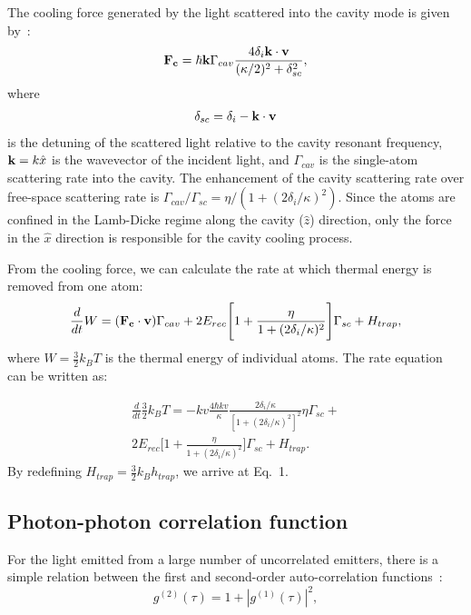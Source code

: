 \documentclass[aps,prl,superscriptaddress,onecloumn,nobibnotes]{revtex4-1}
\begin{document}
The cooling force generated by the light scattered into the cavity mode is given by~\cite{VV:pra2001}:
\begin{eqnarray}
{\bf F_c}=\hbar  {\bf k}\Gamma_{cav}\frac{4 \delta_i {\bf k} \cdot{\bf v}}{(\kappa/2)^2+\delta_{sc}^2},
\end{eqnarray}
where 
\begin{eqnarray}
\delta_{sc}=\delta_i-{\bf k}\cdot{\bf v}
\end{eqnarray}
is the detuning of the scattered light relative to the cavity resonant frequency, ${\bf k} =k \hat{x}$ is the wavevector of the incident light, and $\Gamma_{cav}$ is the single-atom scattering rate into the cavity. The enhancement of the cavity scattering rate over free-space scattering rate is $\Gamma_{cav}/\Gamma_{sc}=\eta/(1+(2\delta_i/\kappa)^2)$. Since the atoms are confined in the Lamb-Dicke regime along the cavity ($\hat{z}$) direction, only the force in the $\hat{x}$ direction is responsible for the cavity cooling process. 

From the cooling force, we can calculate the rate at which thermal energy is removed from one atom:
\begin{eqnarray}
\frac{d}{dt} W= ({\bf F_c} \cdot {\bf v})\Gamma_{cav}+2 E_{rec} \Bigg[1+\frac{\eta}{1+(2\delta_i/\kappa)^2}\Bigg]\Gamma_{sc}+H_{trap},
\end{eqnarray}
where $W=\frac{3}{2}k_B T$ is the thermal energy of individual atoms. The rate equation can be written as:

\begin{eqnarray}
\frac{d}{dt} \frac{3}{2} k_B T= - k  v\frac{4 \hbar kv}{\kappa}\frac{2\delta_i/\kappa}{[1+(2\delta_i/\kappa)^2]^2}\eta \Gamma_{sc}+\nonumber \\
2 E_{rec} \Bigg[1+\frac{\eta}{1+(2\delta_i/\kappa)^2}\Bigg]\Gamma_{sc}+H_{trap}.
\label{energyrate}
\end{eqnarray}
By redefining $H_{trap}=\frac{3}{2}k_B h_{trap}$, we arrive at Eq.~1.

\subsection*{Photon-photon correlation function} 

For the light emitted from a large number of uncorrelated emitters, there is a simple relation between the first and second-order auto-correlation functions~\cite{Loudon1983}:
\begin{equation}
g^{(2)}(\tau)=1+|g^{(1)}(\tau)| ^2,
\label{eq:g2g1}
\end{equation}
\end{document}
